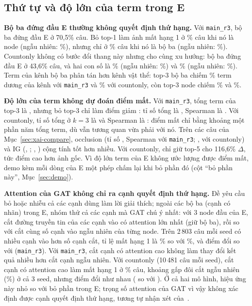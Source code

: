\subsection{Thứ tự và độ lớn của term trong E}\label{sec:xai-findings}

\textbf{Bộ ba đứng đầu E thường không quyết định thứ hạng.}
Với \texttt{main\_r3}, bộ ba đứng đầu E ở 70,5\% câu.
Bỏ top-1 làm ảnh mất hạng 1 ở \% câu khi nó là node (ngẫu nhiên: \%), nhưng chỉ ở \% câu khi nó là bộ ba (ngẫu nhiên: \%).
Countonly không có bước đổi thang này nhưng cho cùng xu hướng: bộ ba đứng đầu E ở 43,6\% câu, và hai con số là \% (ngẫu nhiên: \%) và \% (ngẫu nhiên: \%).
Term của kênh bộ ba phân tán hơn kênh vật thể: top-3 bộ ba chiếm \% term dương của kênh với \texttt{main\_r3} và \% với countonly, còn top-3 node chiếm \% và \%.

\textbf{Độ lớn của term không dự đoán điểm mất.}
Với \texttt{main\_r3}, tổng term của top-3 là , nhưng bỏ top-3 chỉ làm điểm giảm : tỉ số tổng là , Spearman là .
Với countonly, tỉ số tổng ở $k=3$ là  và Spearman là : điểm mất chỉ bằng khoảng một phần năm tổng term, dù vẫn tương quan vừa phải với nó.
Trên các câu của Mục~\ref{sec:xai-compare}, occlusion (tỉ số , Spearman  với \texttt{main\_r3}; ,  với countonly) và IG (, ; , ) cộng tính tốt hơn nhiều.
Với countonly, chỉ giữ top-5 cho 116,6\% $\Delta$, tức điểm cao hơn ảnh gốc.
Vì độ lớn term của E không ước lượng được điểm mất, demo kèm mỗi dòng của E một phép chấm lại khi bỏ phần đó (cột ``bỏ phần này'', Mục~\ref{sec:demo}).

\textbf{Attention của GAT không chỉ ra cạnh quyết định thứ hạng.}
Đề yêu cầu bỏ hoặc nhiễu cả các cạnh dùng làm lời giải thích; ngoài các bộ ba (cạnh có nhãn) trong E, nhóm thử cả các cạnh mà GAT chú ý nhất: với 3 node đầu của E, cắt đường truyền tin của các cạnh vào có attention lớn nhất (giữ bộ ba), rồi so với cắt cùng số cạnh vào ngẫu nhiên của từng node.
Trên 2\,803 câu mỗi seed có nhiều cạnh vào hơn số cạnh cắt, tỉ lệ mất hạng 1 là \% so với \%, và điểm đổi  so với  (\texttt{main\_r3}).
Với \texttt{main\_r3}, cắt cạnh có attention cao không làm thay đổi kết quả nhiều hơn cắt cạnh ngẫu nhiên.
Với countonly (10\,481 câu mỗi seed), cắt cạnh có attention cao làm mất hạng 1 ở \% câu, khoảng gấp đôi cắt ngẫu nhiên (\%) ở cả 3 seed, nhưng điểm đổi như nhau ( so với ).
Ở cả hai mô hình, hiệu ứng này nhỏ so với bỏ phần trong E; trọng số attention của GAT vì vậy không xác định được cạnh quyết định thứ hạng, tương tự nhận xét của~\cite{xai-jain2019attention}.

